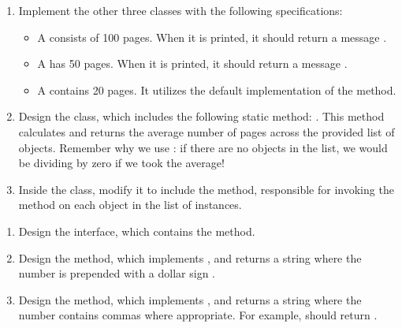 \begin{enumerate}[label=(\alph*)]
\item Implement the other three classes with the following specifications:
\begin{itemize}
\item A  consists of 100 pages. When it is printed, it should return a message .
\item A  has 50 pages. When it is printed, it should return a message .
\item A  contains 20 pages. It utilizes the default implementation of the  method.
\end{itemize}
\item Design the  class, which includes the following static method: . This method calculates and returns the average number of pages across the provided list of  objects. Remember why we use : if there are no  objects in the list, we would be dividing by zero if we took the average! 
\item Inside the  class, modify it to include the  method, responsible for invoking the  method on each object in the list of  instances.
\end{enumerate}

\newpage %
\begin{enumerate}[label=(\alph*)]
  \item Design the  interface, which contains the  method. 
  \item Design the  method, which implements , and returns a string where the number is prepended with a dollar sign .
  \item Design the  method, which implements , and returns a string where the number contains commas where appropriate. For example,  should return .
\end{enumerate}


